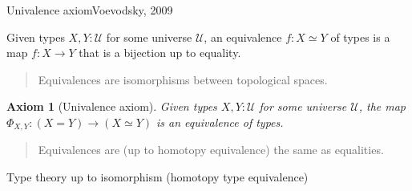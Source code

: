 \documentclass[english,handout]{beamer}
\newtheorem{axiom}[theorem]{Axiom}
\begin{document}





\begin{frame}{Univalence axiom}{Voevodsky, 2009}


\begin{definition}
 Given types $X,Y : \mathcal{U}$ for some universe $\mathcal{U}$, an equivalence $f: X \simeq Y $ of types is a map $f : X \rightarrow Y$ that is a bijection up to equality.
\end{definition}

\begin{quotation}
Equivalences are isomorphisms between topological spaces.
\end{quotation}

\begin{axiom}[Univalence axiom] 
 Given types $X,Y : \mathcal{U}$ for some universe $\mathcal{U}$, the map \(\Phi_{X,Y}: (X=Y) \rightarrow (X \simeq Y)\) is an equivalence of types. 
\end{axiom}

\begin{quotation}
  Equivalences are (up to homotopy equivalence) the same as equalities.
\end{quotation}

Type theory up to isomorphism (homotopy type equivalence)
\end{frame}
\end{document}
